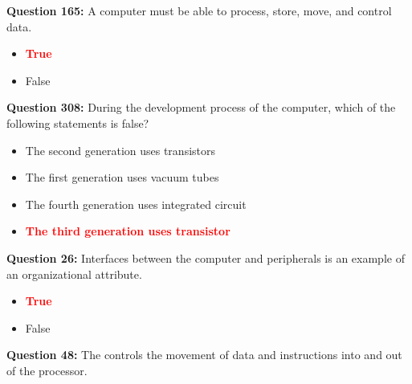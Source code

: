 \documentclass[12pt,a4paper]{article}
\begin{document}
\vspace{0.5cm}

\vspace{0.5cm}

\textbf{Question 165:} A computer must be able to process, store, move, and control data.

\begin{itemize}
    \item[\textbf{A.}] \textcolor{red}{\textbf{True}}
    \item[\textbf{B.}] False
\end{itemize}

\vspace{0.5cm}

\vspace{0.5cm}

\textbf{Question 308:} During the development process of the computer, which of the following statements is false?

\begin{itemize}
    \item[\textbf{A.}] The second generation uses transistors
    \item[\textbf{B.}] The first generation uses vacuum tubes
    \item[\textbf{C.}] The fourth generation uses integrated circuit
    \item[\textbf{D.}] \textcolor{red}{\textbf{The third generation uses transistor}}
\end{itemize}

\vspace{0.5cm}

\vspace{0.5cm}

\textbf{Question 26:} Interfaces between the computer and peripherals is an example of an organizational attribute.

\begin{itemize}
    \item[\textbf{A.}] \textcolor{red}{\textbf{True}}
    \item[\textbf{B.}] False
\end{itemize}

\vspace{0.5cm}

\vspace{0.5cm}

\textbf{Question 48:} The \underline{\hspace{1.5cm}} controls the movement of data and instructions into and out of the processor.
\end{document}
